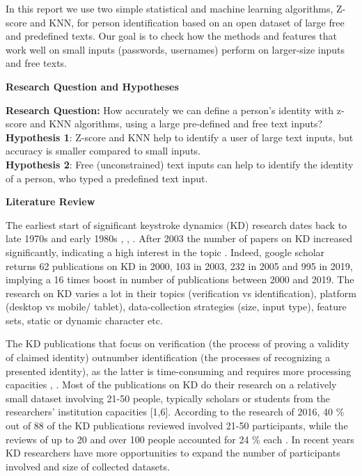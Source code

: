 \documentclass[12pt,a4]{article}
\begin{document}
In this report we use two simple statistical and machine learning algorithms, Z-score and KNN, for person identification based on an open dataset of large free and predefined texts. Our goal is to check how  the methods and features that work well on small inputs (passwords, usernames) perform on larger-size inputs and free texts.

\bigskip
\large\textbf{Research Question and Hypotheses}
\bigskip

\normalsize
\textbf{Research Question:} How accurately we can define a person's identity with z-score and KNN algorithms, using a large pre-defined and free text inputs? \\

\textbf{Hypothesis 1}: Z-score and KNN help to identify a user of large text inputs, but accuracy is smaller compared to small inputs. \\

\textbf{Hypothesis 2}: Free (unconstrained) text inputs can help to identify the identity of a person, who typed a predefined text input. 

\bigskip

\large\textbf{Literature Review}
\bigskip

\normalsize
The earliest start of significant keystroke dynamics (KD) research dates back to late 1970s and early 1980s \cite{Teh:2013}, \cite{Liakat:2017}, \cite{killourhy2009comparing}. After 2003 the number of papers on KD increased significantly, indicating a high interest in the topic \cite{Teh:2013}. Indeed, google scholar returns 62 publications on KD in 2000, 103 in 2003, 232 in 2005 and 995 in 2019, implying a 16 times boost in number of publications between 2000 and 2019. The research on KD varies a lot in their topics (verification vs identification), platform (desktop vs mobile/ tablet), data-collection strategies (size, input type), feature sets, static or dynamic character etc.

The KD publications that focus on verification (the process of proving a validity of claimed identity) outnumber identification (the processes of recognizing a presented identity), as the latter is time-consuming and requires more processing capacities \cite{Teh:2013}, \cite{banerjee2014_emnlp}. Most of the publications on KD do their research on a relatively small dataset involving 21-50 people, typically scholars or students from the researchers’ institution capacities [1,6]. According to the research of 2016, 40 \% out of 88 of the KD publications reviewed involved 21-50 participants, while the reviews of up to 20 and over 100 people accounted for 24 \% each \cite{Liakat:2017}. In recent years KD researchers have more opportunities to expand the number of participants involved and size of collected datasets.
\end{document}
